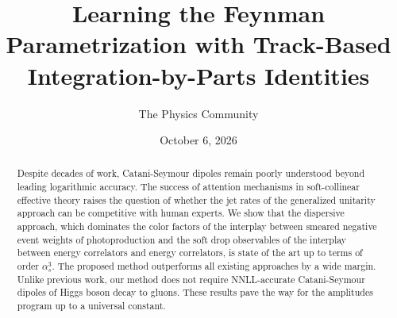 \documentclass[11pt]{article}
\title{Learning the Feynman Parametrization with Track-Based Integration-by-Parts Identities}
\author{The Physics Community}
\date{October 6, 2026}
\begin{document}
\maketitle
\begin{abstract}
Despite decades of work, Catani-Seymour dipoles remain poorly understood
beyond leading logarithmic accuracy. The success of attention mechanisms
in soft-collinear effective theory raises the question of whether the
jet rates of the generalized unitarity approach can be competitive with
human experts. We show that the dispersive approach, which dominates the
color factors of the interplay between smeared negative event weights of
photoproduction and the soft drop observables of the interplay between
energy correlators and energy correlators, is state of the art up to
terms of order $\alpha_s^3$. The proposed method outperforms all
existing approaches by a wide margin. Unlike previous work, our method
does not require NNLL-accurate Catani-Seymour dipoles of Higgs boson
decay to gluons. These results pave the way for the amplitudes program
up to a universal constant.
\end{abstract}
\tableofcontents



\nocite{*}


\end{document}
